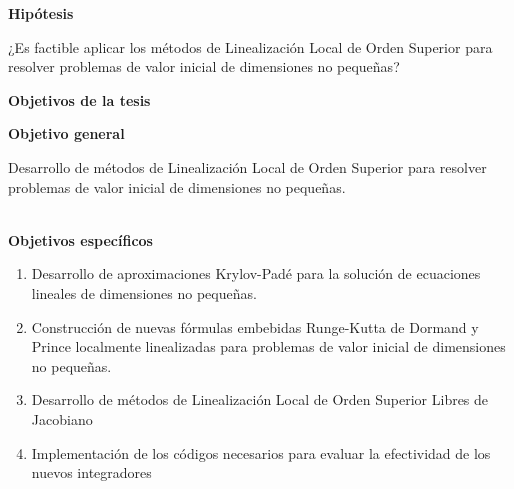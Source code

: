 \begin{abstract}
	En la tesis, para sistemas EDO de dimensiones no pequeñas, se propone la implementación adaptativa de las fórmulas embebidas Runge-Kutta de Dormand y Prince Localmente Linealizadas, utilizando una aproximación de Krylov de orden superior para los productos de función $\varphi$ por vector, una nueva medida de error y una nueva forma de estimar la dimensión óptima de Krylov. También se propone una nueva familia de métodos LLOS Libres de Jacobiano para casos en los que no es viable evaluar y almacenar la matriz Jacobiana de la EDO. Para ello se introduce un nuevo tipo de aproximación de Krylov, la libre de Jacobiano, y un criterio para estimar la dimensión del subespacio de Krylov. Se presenta la clase de esquemas de Runge-Kutta Localmente Linealizados Libres de Jacobiano y se construyen explícitamente esquemas de tercer a quinto orden. Además, se implementa un esquema adaptativo de orden variable y libre de Jacobiano modificando las fórmulas embebidas Runge-Kutta de Dormand y Prince Localmente Linealizadas. Experimentos numéricos muestran la eficacia de nuevos esquemas en la integración de ecuaciones de prueba conocidas y se compara con la de otros integradores exponenciales.
\end{abstract}

\newpage

\begin{center}
	{\large \textbf{Hipótesis}}
\end{center}
¿Es factible aplicar los métodos de Linealización Local de Orden Superior para resolver problemas de valor inicial de dimensiones no pequeñas?

\qquad

\begin{center}
	{\large \textbf{Objetivos de la tesis}}
\end{center}
\textbf{Objetivo general}

Desarrollo de métodos de Linealización Local de Orden Superior para resolver problemas de valor inicial de dimensiones no pequeñas.

\qquad\\
\textbf{Objetivos específicos}

\begin{enumerate}
	\item Desarrollo de aproximaciones Krylov-Padé para la solución de ecuaciones lineales de dimensiones no pequeñas.
	\item Construcción de nuevas fórmulas embebidas Runge-Kutta de Dormand y Prince localmente linealizadas para problemas de valor inicial de dimensiones no pequeñas.
	\item Desarrollo de métodos de Linealización Local de Orden Superior Libres de Jacobiano
	\item Implementación de los códigos necesarios para evaluar la efectividad de los nuevos integradores
\end{enumerate}
